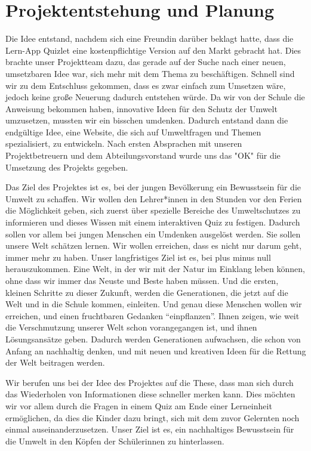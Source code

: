 
\section{Projektentstehung und Planung}
Die Idee entstand, nachdem sich eine Freundin darüber beklagt hatte, dass die Lern-App Quizlet eine kostenpflichtige Version auf den Markt gebracht hat. Dies brachte unser Projektteam dazu, das gerade auf der Suche nach einer neuen, umsetzbaren Idee war, sich mehr mit dem Thema zu beschäftigen. Schnell sind wir zu dem Entschluss gekommen, dass es zwar einfach zum Umsetzen wäre, jedoch keine große Neuerung dadurch entstehen würde. Da wir von der Schule die Anweisung bekommen haben, innovative Ideen für den Schutz der Umwelt umzusetzen, mussten wir ein bisschen umdenken. Dadurch entstand dann die endgültige Idee, eine Website, die sich auf Umweltfragen und Themen spezialisiert, zu entwickeln. Nach ersten Absprachen mit unseren Projektbetreuern und dem Abteilungsvorstand wurde uns das "OK" für die Umsetzung des Projekts gegeben. 

Das Ziel des Projektes ist es, bei der jungen Bevölkerung ein Bewusstsein für die Umwelt zu schaffen. Wir wollen den Lehrer*innen in den Stunden vor den Ferien die Möglichkeit geben, sich zuerst über spezielle Bereiche des Umweltschutzes zu informieren und dieses Wissen mit einem interaktiven Quiz zu festigen. Dadurch sollen vor allem bei jungen Menschen ein Umdenken ausgelöst werden. Sie sollen unsere Welt schätzen lernen. Wir wollen erreichen, dass es nicht nur darum geht, immer mehr zu haben. Unser langfristiges Ziel ist es, bei plus minus null herauszukommen. Eine Welt, in der wir mit der Natur im Einklang leben können, ohne dass wir immer das Neuste und Beste haben müssen. Und die ersten, kleinen Schritte zu dieser Zukunft, werden die Generationen, die jetzt auf die Welt und in die Schule kommen, einleiten. Und genau diese Menschen wollen wir erreichen, und einen fruchtbaren Gedanken “einpflanzen”. Ihnen zeigen, wie weit die Verschmutzung unserer Welt schon vorangegangen ist, und ihnen Lösungsansätze geben. Dadurch werden Generationen aufwachsen, die schon von Anfang an nachhaltig denken, und mit neuen und kreativen Ideen für die Rettung der Welt beitragen werden. 

   

Wir berufen uns bei der Idee des Projektes auf die These, dass man sich durch das Wiederholen von Informationen diese schneller merken kann. Dies möchten wir vor allem durch die Fragen in einem Quiz am Ende einer Lerneinheit ermöglichen, da dies die Kinder dazu bringt, sich mit dem zuvor Gelernten noch einmal auseinanderzusetzen. Unser Ziel ist es, ein nachhaltiges Bewusstsein für die Umwelt in den Köpfen der Schüler\*innen zu hinterlassen.  

